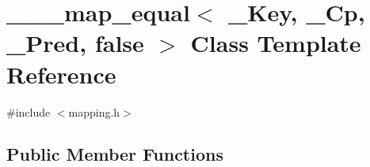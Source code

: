 \hypertarget{class______map__equal_3_01___key_00_01___cp_00_01___pred_00_01false_01_4}{}\section{\+\_\+\+\_\+\+\_\+map\+\_\+equal$<$ \+\_\+\+Key, \+\_\+\+Cp, \+\_\+\+Pred, false $>$ Class Template Reference}
\label{class______map__equal_3_01___key_00_01___cp_00_01___pred_00_01false_01_4}


{\ttfamily \#include $<$mapping.\+h$>$}

\subsection*{Public Member Functions}
